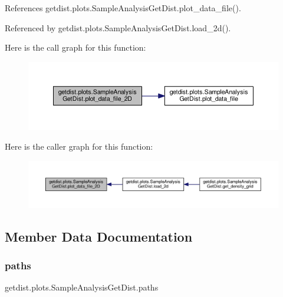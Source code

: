 References getdist.\+plots.\+Sample\+Analysis\+Get\+Dist.\+plot\+\_\+data\+\_\+file().



Referenced by getdist.\+plots.\+Sample\+Analysis\+Get\+Dist.\+load\+\_\+2d().

Here is the call graph for this function\+:
\nopagebreak
\begin{figure}[H]
\begin{center}
\leavevmode
\includegraphics[width=350pt]{classgetdist_1_1plots_1_1SampleAnalysisGetDist_abca4dbc19b7d18f4b4bc421e38a9a6d3_cgraph}
\end{center}
\end{figure}
Here is the caller graph for this function\+:
\nopagebreak
\begin{figure}[H]
\begin{center}
\leavevmode
\includegraphics[width=350pt]{classgetdist_1_1plots_1_1SampleAnalysisGetDist_abca4dbc19b7d18f4b4bc421e38a9a6d3_icgraph}
\end{center}
\end{figure}


\subsection{Member Data Documentation}
\mbox{\label{classgetdist_1_1plots_1_1SampleAnalysisGetDist_a7b6afff3ebf48a36e5488c3ae1a3ebfd}} 
\subsubsection{\texorpdfstring{paths}{paths}}
{\footnotesize\ttfamily getdist.\+plots.\+Sample\+Analysis\+Get\+Dist.\+paths}



